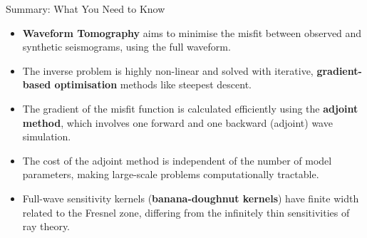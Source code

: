 \documentclass{beamer}
\begin{document}

\begin{frame}{Summary: What You Need to Know}
    \begin{itemize}
        \item \textbf{Waveform Tomography} aims to minimise the misfit between observed and synthetic seismograms, using the full waveform.
        \pause
        \item The inverse problem is highly non-linear and solved with iterative, \textbf{gradient-based optimisation} methods like steepest descent.
        \pause
        \item The gradient of the misfit function is calculated efficiently using the \textbf{adjoint method}, which involves one forward and one backward (adjoint) wave simulation.
        \pause
        \item The cost of the adjoint method is independent of the number of model parameters, making large-scale problems computationally tractable.
        \pause
        \item Full-wave sensitivity kernels (\textbf{banana-doughnut kernels}) have finite width related to the Fresnel zone, differing from the infinitely thin sensitivities of ray theory.
    \end{itemize}
\end{frame}
\end{document}
